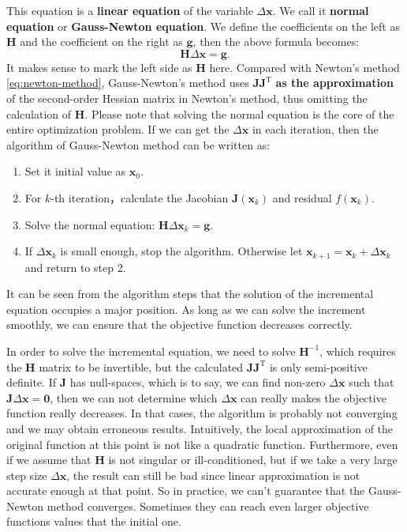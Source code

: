 This equation is a \textbf{linear equation} of the variable $\Delta \bm{x}$. We call it \textbf{normal equation} or \textbf{Gauss-Newton equation}. We define the coefficients on the left as $\bm{H}$ and the coefficient on the right as $\bm{g}$, then the above formula becomes:
\begin{equation}
    \label{eq:minimize-deltax}
    \bm{H} \Delta \bm{x} = \bm{g}.
\end{equation}
It makes sense to mark the left side as $\bm{H}$ here. Compared with Newton's method \ref{eq:newton-method}, Gauss-Newton's method uses $\bm{J}\bm{J}^\mathrm{T}$ \textbf{as the approximation} of the second-order Hessian matrix in Newton's method, thus omitting the calculation of $\bm{H}$. Please note that solving the normal equation is the core of the entire optimization problem. If we can get the $\Delta \bm{x}$ in each iteration, then the algorithm of Gauss-Newton method can be written as:

\begin{mdframed}
    \begin{enumerate}
        \item Set it initial value as $\bm{x}_0$.
        \item For $k$-th iteration，calculate the Jacobian $\bm{J}(\bm{x}_k)$ and residual $f(\bm{x}_k)$.
        \item Solve the normal equation: $\bm{H} \Delta \bm{x}_k = \bm{g}$.
        \item If $\Delta \bm{x}_k$ is small enough, stop the algorithm. Otherwise let $\bm{x}_{k+1} = \bm{x}_k+\Delta \bm{x}_k$ and return to step 2.
    \end{enumerate}
\end{mdframed}

It can be seen from the algorithm steps that the solution of the incremental equation occupies a major position. As long as we can solve the increment smoothly, we can ensure that the objective function decreases correctly.

In order to solve the incremental equation, we need to solve $\bm{H}^{-1}$, which requires the $\bm{H}$ matrix to be invertible, but the calculated $\bm{J} \bm{ J}^\mathrm{T}$ is only semi-positive definite. If $\bm{J}$ has null-spaces, which is to say, we can find non-zero $\Delta \bm{x}$ such that $\bm{J} \Delta\bm{x} = \bm{0}$, then we can not determine which $\Delta \bm{x}$ can really makes the objective function really decreases. In that cases, the algorithm is probably not converging and we may obtain erroneous results. Intuitively, the local approximation of the original function at this point is not like a quadratic function. Furthermore, even if we assume that $\bm{H}$ is not singular or ill-conditioned, but if we take a very large step size $\Delta \bm{x}$, the result can still be bad since linear approximation is not accurate enough at that point. So in practice, we can't guarantee that the Gauss-Newton method converges. Sometimes they can reach even larger objective functions values that the initial one. 

